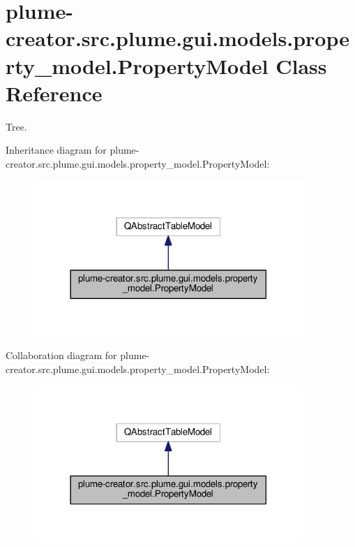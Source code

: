 \hypertarget{classplume-creator_1_1src_1_1plume_1_1gui_1_1models_1_1property__model_1_1_property_model}{}\section{plume-\/creator.src.\+plume.\+gui.\+models.\+property\+\_\+model.\+Property\+Model Class Reference}
\label{classplume-creator_1_1src_1_1plume_1_1gui_1_1models_1_1property__model_1_1_property_model}


Tree.  




Inheritance diagram for plume-\/creator.src.\+plume.\+gui.\+models.\+property\+\_\+model.\+Property\+Model\+:\nopagebreak
\begin{figure}[H]
\begin{center}
\leavevmode
\includegraphics[width=290pt]{classplume-creator_1_1src_1_1plume_1_1gui_1_1models_1_1property__model_1_1_property_model__inherit__graph}
\end{center}
\end{figure}


Collaboration diagram for plume-\/creator.src.\+plume.\+gui.\+models.\+property\+\_\+model.\+Property\+Model\+:\nopagebreak
\begin{figure}[H]
\begin{center}
\leavevmode
\includegraphics[width=290pt]{classplume-creator_1_1src_1_1plume_1_1gui_1_1models_1_1property__model_1_1_property_model__coll__graph}
\end{center}
\end{figure}
